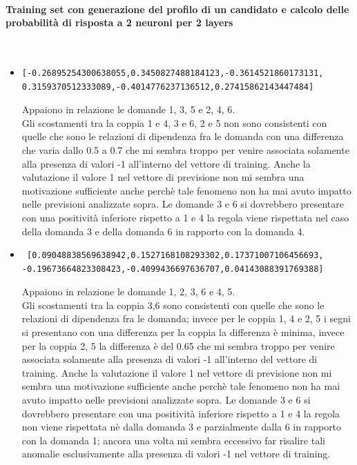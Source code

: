 \documentclass[11pt,a4paper,italian]{article}
\begin{document}
\paragraph{Training set con generazione del profilo di un candidato e calcolo delle probabilit\`a di risposta a  2 neuroni per 2 layers}\mbox{}
\label{Training set con generazione del profilo di un candidato e calcolo delle probabilita di risposta a  2 neuroni}
\\
\noindent
\begin{itemize}
\item \begin{verbatim}[-0.26895254300638055,0.3450827488184123,-0.3614521860173131,
0.3159370512333089,-0.4014776237136512,0.27415862143447484]
\end{verbatim}
Appaiono in relazione le domande 1, 3, 5  e 2, 4, 6.\\
Gli scostamenti tra la coppia 1 e 4, 3 e 6, 2 e 5 non sono consistenti con quelle che sono le relazioni di dipendenza fra le domanda con una differenza che varia dallo 0.5 a 0.7 che mi sembra troppo per venire associata solamente alla presenza di valori -1 all'interno del vettore di training. Anche la valutazione il valore 1 nel vettore di previsione non mi sembra una motivazione sufficiente anche perch\`e tale fenomeno non ha mai avuto impatto nelle previsioni analizzate sopra.
Le domande 3 e 6 si dovrebbero presentare con una positivit\`a inferiore rispetto a 1 e 4 la regola viene rispettata nel caso della domanda 3 e della domanda 6 in rapporto con la domanda 4.

\item \begin{verbatim} [0.09048838569638942,0.1527168108293302,0.17371007106456693,
-0.19673664823308423,-0.4099436697636707,0.04143088391769388]
\end{verbatim}
Appaiono in relazione le domande 1, 2, 3, 6 e 4, 5.\\
Gli scostamenti tra la coppia 3,6 sono consistenti con quelle che sono le relazioni di dipendenza fra le domanda;  invece per le coppia 1, 4 e 2, 5 i segni si presentano con una differenza  per la coppia la differenza \`e minima, invece per la coppia 2, 5 la differenza \`e del 0.65 che mi sembra troppo per venire associata solamente alla presenza di valori -1 all'interno del vettore di training. Anche la valutazione il valore 1 nel vettore di previsione non mi sembra una motivazione sufficiente anche perch\`e tale fenomeno non ha mai avuto impatto nelle previsioni analizzate sopra.
Le domande 3 e 6 si dovrebbero presentare con una positivit\`a inferiore rispetto a 1 e 4 la regola non viene rispettata n\`e dalla domanda 3 e parzialmente dalla 6 in rapporto con la domanda 1; ancora una volta mi sembra eccessivo far risalire tali anomalie esclusivamente alla presenza di valori -1 nel vettore di training.


\end{itemize}
\end{document}
